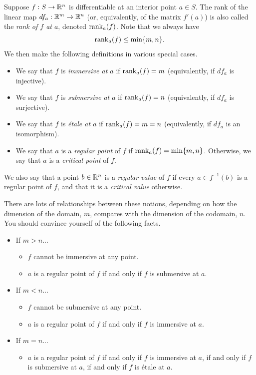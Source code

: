 \begin{definition} \label{immersive-submersive-critical} 
	Suppose $f : S \to \mathbb{R}^n$ is differentiable at an interior point $a \in S$. The rank of the linear map $df_a : \mathbb{R}^m \to \mathbb{R}^n$ (or, equivalently, of the matrix $f'(a)$) is also called the \emph{rank of $f$ at $a$}, denoted $\operatorname{rank}_a(f)$. Note that we always have \[ \operatorname{rank}_a(f) \leq \min\{m,n\}. \]
	We then make the following definitions in various special cases. 
	\begin{itemize}
		\item We say that $f$ is \emph{immersive at $a$} if $\operatorname{rank}_a(f) = m$ (equivalently, if $df_a$ is injective). 
		\item We say that $f$ is \emph{submersive at $a$} if $\operatorname{rank}_a(f) = n$ (equivalently, if $df_a$ is surjective). 
		\item We say that $f$ is \emph{\'etale at $a$} if $\operatorname{rank}_a(f) = m = n$ (equivalently, if $df_a$ is an isomorphism). 
		\item We say that $a$ is a \emph{regular point} of $f$ if $\operatorname{rank}_a(f) = \min\{m,n\}$. Otherwise, we say that $a$ is a \emph{critical point} of $f$.
	\end{itemize}
	We also say that a point $b \in \mathbb{R}^n$ is a \emph{regular value} of $f$ if every $a \in f^{-1}(b)$ is a regular point of $f$, and that it is a \emph{critical value} otherwise. 
\end{definition}

There are lots of relationships between these notions, depending on how the dimension of the domain, $m$, compares with the dimension of the codomain, $n$. You should convince yourself of the following facts.  
\begin{itemize}
	\item If $m > n$...
	\begin{itemize}
		\item $f$ cannot be immersive at any point.
		\item $a$ is a regular point of $f$ if and only if $f$ is submersive at $a$.
	\end{itemize}
	\item If $m < n$...
	\begin{itemize}
		\item $f$ cannot be submersive at any point.
		\item $a$ is a regular point of $f$ if and only if $f$ is immersive at $a$.
	\end{itemize}
	\item If $m = n$...
	\begin{itemize}
		\item $a$ is a regular point of $f$ if and only if $f$ is immersive at $a$, if and only if $f$ is submersive at $a$, if and only if $f$ is \'etale at $a$. 
	\end{itemize}
\end{itemize}

